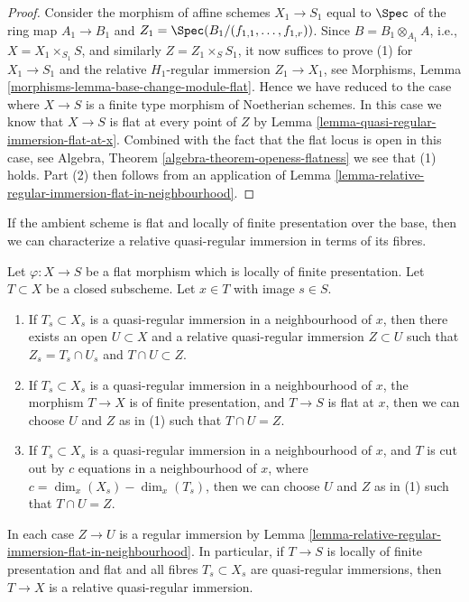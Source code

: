 \begin{proof}
\medskip\noindent
Consider the morphism of affine schemes
$X_1 \to S_1$ equal to $\Spec$ of the
ring map $A_1 \to B_1$ and
$Z_1 = \Spec(B_1/(f_{1, 1}, \ldots, f_{1, r}))$.
Since $B = B_1 \otimes_{A_1} A$, i.e., $X = X_1 \times_{S_1} S$,
and similarly $Z = Z_1 \times_S S_1$,
it now suffices to prove (1) for $X_1 \to S_1$ and the relative
$H_1$-regular immersion $Z_1 \to X_1$, see
Morphisms, Lemma \ref{morphisms-lemma-base-change-module-flat}.
Hence we have reduced to the case where $X \to S$ is a finite type
morphism of Noetherian schemes.
In this case we know that $X \to S$ is flat at every
point of $Z$ by
Lemma \ref{lemma-quasi-regular-immersion-flat-at-x}.
Combined with the fact that the flat locus is open in this case, see
Algebra, Theorem \ref{algebra-theorem-openess-flatness}
we see that (1) holds. Part (2) then follows from an application of
Lemma \ref{lemma-relative-regular-immersion-flat-in-neighbourhood}.
\end{proof}

\noindent
If the ambient scheme is flat and locally of finite presentation over
the base, then we can characterize a relative
quasi-regular immersion in terms of its fibres.

\begin{lemma}
\label{lemma-fibre-quasi-regular}
Let $\varphi : X \to S$ be a flat morphism which is locally of finite
presentation. Let $T \subset X$ be a closed subscheme.
Let $x \in T$ with image $s \in S$.
\begin{enumerate}
\item If $T_s \subset X_s$ is a quasi-regular immersion
in a neighbourhood of $x$, then there exists an open
$U \subset X$ and a relative quasi-regular immersion
$Z \subset U$ such that $Z_s = T_s \cap U_s$ and $T \cap U \subset Z$.
\item If $T_s \subset X_s$ is a quasi-regular immersion
in a neighbourhood of $x$, the morphism $T \to X$ is of finite
presentation, and $T \to S$ is flat at $x$, then we can choose $U$ and
$Z$ as in (1) such that $T \cap U = Z$.
\item If $T_s \subset X_s$ is a quasi-regular immersion in a neighbourhood
of $x$, and $T$ is cut out by $c$ equations in a neighbourhood of $x$,
where $c = \dim_x(X_s) - \dim_x(T_s)$, then we can choose $U$ and $Z$ as in (1)
such that $T \cap U = Z$.
\end{enumerate}
In each case $Z \to U$ is a regular immersion by
Lemma \ref{lemma-relative-regular-immersion-flat-in-neighbourhood}.
In particular, if $T \to S$ is locally of finite presentation and flat and
all fibres $T_s \subset X_s$ are quasi-regular immersions, then
$T \to X$ is a relative quasi-regular immersion.
\end{lemma}

